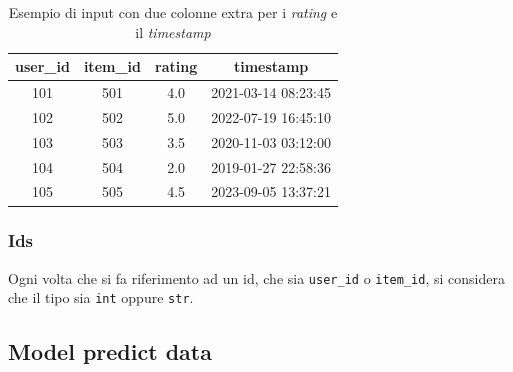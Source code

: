 \begin{table}[H]
    \centering
    \begin{tabular}{|c|c|c|c|}
    \hline
    \textbf{user\_id} & \textbf{item\_id} & \textbf{rating} & \textbf{timestamp} \\
    \hline
        101 & 501 & 4.0 & 2021-03-14 08:23:45 \\
        102 & 502 & 5.0 & 2022-07-19 16:45:10 \\
        103 & 503 & 3.5 & 2020-11-03 03:12:00 \\
        104 & 504 & 2.0 & 2019-01-27 22:58:36 \\
        105 & 505 & 4.5 & 2023-09-05 13:37:21 \\
    \hline
    \end{tabular}
    \caption{Esempio di input con due colonne extra per i \textit{rating} e il \textit{timestamp}}
    \label{tab:ratings}
\end{table}

\subsubsection{Ids}

Ogni volta che si fa riferimento ad un id, che sia \texttt{user\_id} o \texttt{item\_id}, si considera che il tipo sia \texttt{int} oppure \texttt{str}. 

\subsection{Model predict data}\label{model_predict_data}

